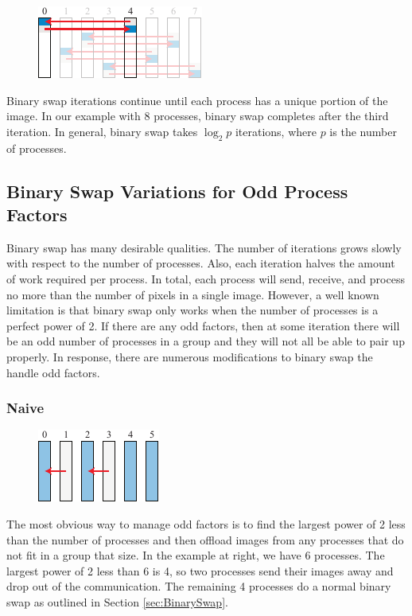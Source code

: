 \documentclass{vgtc}                          %
\begin{document}
\begin{figure}
  \includegraphics[scale=.75]{binary-swap-3}
\end{figure}
Binary swap iterations continue until each process has a unique portion of the image.
In our example with 8 processes, binary swap completes after the third iteration.
In general, binary swap takes $\log_{2}p$ iterations, where $p$ is the number of processes.

\subsection{Binary Swap Variations for Odd Process Factors}
\label{sec:BinarySwapVariations}

Binary swap has many desirable qualities.
The number of iterations grows slowly with respect to the number of processes.
Also, each iteration halves the amount of work required per process.
In total, each process will send, receive, and process no more than the number of pixels in a single image.
However, a well known limitation is that binary swap only works when the number of processes is a perfect power of 2.
If there are any odd factors, then at some iteration there will be an odd number of processes in a group and they will not all be able to pair up properly.
In response, there are numerous modifications to binary swap the handle odd factors.

\subsubsection{Naive}

\begin{figure}
  \includegraphics[scale=.75]{naive}
\end{figure}
The most obvious way to manage odd factors is to find the largest power of 2 less than the number of processes and then offload images from any processes that do not fit in a group that size.
In the example at right, we have 6 processes.
The largest power of 2 less than 6 is 4, so two processes send their images away and drop out of the communication.
The remaining 4 processes do a normal binary swap as outlined in Section \ref{sec:BinarySwap}.
\end{document}
